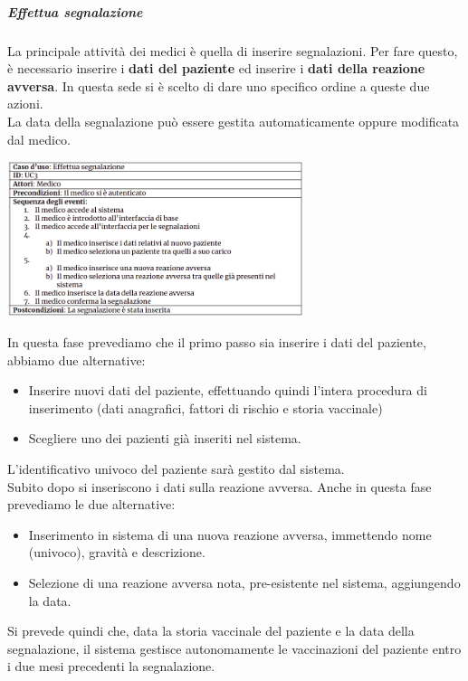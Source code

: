 \documentclass{article}
\begin{document}
\newpage
\subparagraph*{Effettua segnalazione}
La principale attività dei medici è quella di inserire segnalazioni. Per fare questo, è necessario
inserire i \textbf{dati del paziente} ed inserire i \textbf{dati della reazione avversa}. In questa sede si è scelto di dare uno specifico ordine a queste due azioni.\\
La data della segnalazione può essere gestita automaticamente oppure modificata dal medico.
\begin{center}
    \includegraphics[width=0.65\textwidth]{pictures/UC3.png}
\end{center}
In questa fase prevediamo che il primo passo sia inserire i dati del paziente, abbiamo due alternative:
\begin{itemize}
    \item Inserire nuovi dati del paziente, effettuando quindi l'intera procedura di inserimento (dati anagrafici, fattori di rischio e storia vaccinale)
    \item Scegliere uno dei pazienti già inseriti nel sistema.
\end{itemize}
L'identificativo univoco del paziente sarà gestito dal sistema.\\
Subito dopo si inseriscono i dati sulla reazione avversa.
Anche in questa fase prevediamo le due alternative:
\begin{itemize}
    \item Inserimento in sistema di una nuova reazione avversa, immettendo nome (univoco), gravità e descrizione.
    \item Selezione di una reazione avversa nota, pre-esistente nel sistema, aggiungendo la data.
\end{itemize}
Si prevede quindi che, data la storia vaccinale del paziente e la data della segnalazione, il sistema gestisce autonomamente
le vaccinazioni del paziente entro i due mesi precedenti la segnalazione.
\end{document}
